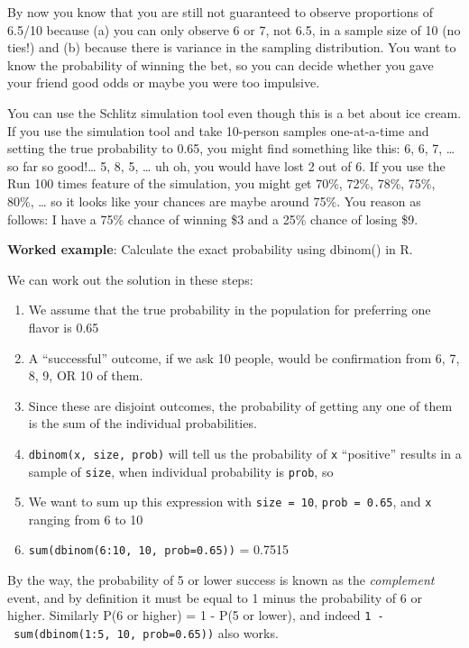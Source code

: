 \documentclass[openany]{book}
\providecommand{\tightlist}{%
  \setlength{\itemsep}{0pt}\setlength{\parskip}{0pt}}
\begin{document}
By now you know that you are still not guaranteed to observe proportions of 6.5/10 because (a) you can only observe 6 or 7, not 6.5, in a sample size of 10 (no ties!) and (b) because there is variance in the sampling distribution. You want to know the probability of winning the bet, so you can decide whether you gave your friend good odds or maybe you were too impulsive.

You can use the Schlitz simulation tool even though this is a bet about ice cream. If you use the simulation tool and take 10-person samples one-at-a-time and setting the true probability to 0.65, you might find something like this: 6, 6, 7, \ldots{} so far so good!\ldots{} 5, 8, 5, \ldots{} uh oh, you would have lost 2 out of 6. If you use the Run 100 times feature of the simulation, you might get 70\%, 72\%, 78\%, 75\%, 80\%, \ldots{} so it looks like your chances are maybe around 75\%. You reason as follows: I have a 75\% chance of winning \$3 and a 25\% chance of losing \$9.

\textbf{Worked example}: Calculate the exact probability using dbinom() in R.

We can work out the solution in these steps:

\begin{enumerate}
\def\labelenumi{\arabic{enumi}.}
\tightlist
\item
  We assume that the true probability in the population for preferring one flavor is 0.65
\item
  A ``successful'' outcome, if we ask 10 people, would be confirmation from 6, 7, 8, 9, OR 10 of them.
\item
  Since these are disjoint outcomes, the probability of getting any one of them is the sum of the individual probabilities.
\item
  \texttt{dbinom(x,\ size,\ prob)} will tell us the probability of \texttt{x} ``positive'' results in a sample of \texttt{size}, when individual probability is \texttt{prob}, so
\item
  We want to sum up this expression with \texttt{size\ =\ 10}, \texttt{prob\ =\ 0.65}, and \texttt{x} ranging from 6 to 10
\item
  \texttt{sum(dbinom(6:10,\ 10,\ prob=0.65))} = 0.7515
\end{enumerate}

By the way, the probability of 5 or lower success is known as the \emph{complement} event, and by definition it must be equal to 1 minus the probability of 6 or higher. Similarly P(6 or higher) = 1 - P(5 or lower), and indeed \texttt{1\ -\ sum(dbinom(1:5,\ 10,\ prob=0.65))} also works.
\end{document}
